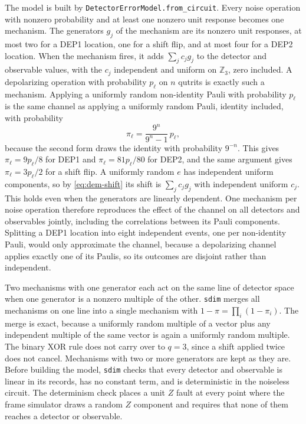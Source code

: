 The model is built by \texttt{DetectorErrorModel.from\_circuit}. Every noise operation with nonzero probability and at least one nonzero unit response becomes one mechanism. The generators $g_j$ of the mechanism are its nonzero unit responses, at most two for a DEP1 location, one for a shift flip, and at most four for a DEP2 location. When the mechanism fires, it adds $\sum_j c_j g_j$ to the detector and observable values, with the $c_j$ independent and uniform on $\mathbb{Z}_3$, zero included. A depolarizing operation with probability $p_\ell$ on $n$ qutrits is exactly such a mechanism. Applying a uniformly random non-identity Pauli with probability $p_\ell$ is the same channel as applying a uniformly random Pauli, identity included, with probability
\begin{equation}
    \pi_\ell = \frac{9^n}{9^n - 1}\, p_\ell ,
\end{equation}
because the second form draws the identity with probability $9^{-n}$. This gives $\pi_\ell = 9p_\ell/8$ for DEP1 and $\pi_\ell = 81p_\ell/80$ for DEP2, and the same argument gives $\pi_\ell = 3p_\ell/2$ for a shift flip. A uniformly random $e$ has independent uniform components, so by \eqref{eq:dem-shift} its shift is $\sum_j c_j g_j$ with independent uniform $c_j$. This holds even when the generators are linearly dependent. One mechanism per noise operation therefore reproduces the effect of the channel on all detectors and observables jointly, including the correlations between its Pauli components. Splitting a DEP1 location into eight independent events, one per non-identity Pauli, would only approximate the channel, because a depolarizing channel applies exactly one of its Paulis, so its outcomes are disjoint rather than independent.

Two mechanisms with one generator each act on the same line of detector space when one generator is a nonzero multiple of the other. \texttt{sdim} merges all mechanisms on one line into a single mechanism with $1 - \pi = \prod_i (1 - \pi_i)$. The merge is exact, because a uniformly random multiple of a vector plus any independent multiple of the same vector is again a uniformly random multiple. The binary XOR rule does not carry over to $q = 3$, since a shift applied twice does not cancel. Mechanisms with two or more generators are kept as they are. Before building the model, \texttt{sdim} checks that every detector and observable is linear in its records, has no constant term, and is deterministic in the noiseless circuit. The determinism check places a unit $Z$ fault at every point where the frame simulator draws a random $Z$ component and requires that none of them reaches a detector or observable.

